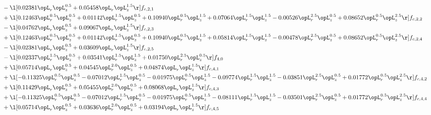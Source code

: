 \begin{alignat}{2}
& - \l[  0.02381 \opL_r \opL_z^{0.5} +  0.05458 \opL_r \opL_z^{1.5}  \r] f_{c,2,1} \nonumber \\ 
& + \l[  0.12463 \opL_r^{0.5} \opL_z^{0.5} +  0.01142 \opL_r^{1.5} \opL_z^{0.5} +  0.10940 \opL_r^{0.5} \opL_z^{1.5} +  0.07064 \opL_r^{1.5} \opL_z^{1.5}   -0.00526 \opL_r^{2.5} \opL_z^{0.5} +  0.08652 \opL_r^{0.5} \opL_z^{2.5}  \r] f_{c,2,2} \nonumber \\ 
& - \l[  0.04762 \opL_r \opL_z^{0.5} +  0.09067 \opL_r \opL_z^{1.5}  \r] f_{c,2,3} \nonumber \\ 
& + \l[  0.12463 \opL_r^{0.5} \opL_z^{0.5} +  0.01142 \opL_r^{1.5} \opL_z^{0.5} +  0.10940 \opL_r^{0.5} \opL_z^{1.5} +  0.05814 \opL_r^{1.5} \opL_z^{1.5}   -0.00478 \opL_r^{2.5} \opL_z^{0.5} +  0.08652 \opL_r^{0.5} \opL_z^{2.5}  \r] f_{c,2,4} \nonumber \\ 
& - \l[  0.02381 \opL_r \opL_z^{0.5} +  0.03609 \opL_r \opL_z^{1.5}  \r] f_{c,2,5} \nonumber \\ 
& - \l[  0.02337 \opL_r^{1.5} \opL_z^{0.5} +  0.03541 \opL_r^{1.5} \opL_z^{1.5} +  0.01750 \opL_r^{2.5} \opL_z^{0.5}  \r] f_{4,0} \nonumber \\ 
& + \l[  0.05714 \opL_r \opL_z^{0.5} +  0.04545 \opL_r^{2.0} \opL_z^{0.5} +  0.04874 \opL_r \opL_z^{1.5}  \r] f_{c,4,1} \nonumber \\ 
& + \l[  -0.11325 \opL_r^{0.5} \opL_z^{0.5}   -0.07012 \opL_r^{1.5} \opL_z^{0.5}   -0.01975 \opL_r^{0.5} \opL_z^{1.5}   -0.09774 \opL_r^{1.5} \opL_z^{1.5}   -0.03851 \opL_r^{2.5} \opL_z^{0.5} +  0.01772 \opL_r^{0.5} \opL_z^{2.5}  \r] f_{c,4,2} \nonumber \\ 
& + \l[  0.11429 \opL_r \opL_z^{0.5} +  0.05455 \opL_r^{2.0} \opL_z^{0.5} +  0.08068 \opL_r \opL_z^{1.5}  \r] f_{c,4,3} \nonumber \\ 
& + \l[  -0.11325 \opL_r^{0.5} \opL_z^{0.5}   -0.07012 \opL_r^{1.5} \opL_z^{0.5}   -0.01975 \opL_r^{0.5} \opL_z^{1.5}   -0.08111 \opL_r^{1.5} \opL_z^{1.5}   -0.03501 \opL_r^{2.5} \opL_z^{0.5} +  0.01772 \opL_r^{0.5} \opL_z^{2.5}  \r] f_{c,4,4} \nonumber \\ 
& + \l[  0.05714 \opL_r \opL_z^{0.5} +  0.03636 \opL_r^{2.0} \opL_z^{0.5} +  0.03194 \opL_r \opL_z^{1.5}  \r] f_{c,4,5} \nonumber \\ 
\end{alignat} 


